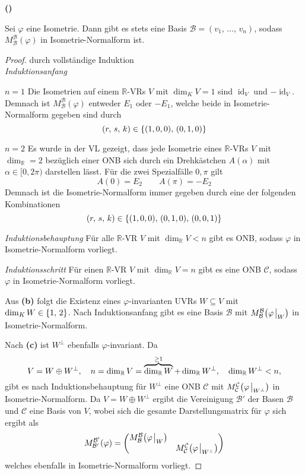 \documentclass[a4paper, 12pt]{scrartcl}
\newcounter{taski}
\newcounter{taskii}[taski]
\newcommand{\ttask}{\stepcounter{taskii}\textbf{(\alph{taskii})}~}
\DeclareMathOperator*{\id}{id}
\begin{document}
\ttask
\begin{theorem}
    Sei $\varphi$ eine Isometrie. Dann gibt es stets eine Basis $\mathcal{B} = (v_1,\, \dots,\, v_n)$, sodass $M^{\mathcal{B}}_{\mathcal{B}}(\varphi)$ in Isometrie-Normalform ist.
\end{theorem}
\begin{proof} durch vollständige Induktion \\
\emph{Induktionsanfang}

$n = 1$ \quad Die Isometrien auf einem $\mathbb{R}$-VRs $V$ mit $\dim_K V = 1$ sind $\id_V$ und $-\id_V$. Demnach ist $M^{\mathcal{B}}_{\mathcal{B}}(\varphi)$ entweder $E_1$ oder $-E_1$, welche beide in Isometrie-Normalform gegeben sind durch
\[ (r,\, s,\, k) \in \qty{(1,0,0),\, (0,1,0)} \]

$n = 2$ \quad Es wurde in der VL gezeigt, dass jede Isometrie eines $\mathbb{R}$-VRs $V$ mit $\dim_ \mathbb{R} = 2$ bezüglich einer ONB sich durch ein Drehkästchen $A(\alpha)$ mit $\alpha \in [0,2\pi)$ darstellen lässt. Für die zwei Spezialfälle $0, \pi$ gilt
\[ A(0) = E_2 \qquad A(\pi) = -E_2 \]
Demnach ist die Isometrie-Normalform immer gegeben durch eine der folgenden Kombinationen
\[ (r,\, s,\, k) \in \qty{(1, 0, 0),\, (0,1,0),\, (0, 0, 1)} \]

\emph{Induktionsbehauptung} Für alle $\mathbb{R}$-VR $V$ mit $\dim_ \mathbb{R} V < n$ gibt es ONB, sodass $\varphi$ in Isometrie-Normalform vorliegt.

\emph{Induktionsschritt} Für einen $\mathbb{R}$-VR $V$ mit $\dim_ \mathbb{R} V = n$ gibt es eine ONB $\mathcal{C}$, sodass $\varphi$ in Isometrie-Normalform vorliegt.

Aus \textbf{(b)} folgt die Existenz eines $\varphi$-invarianten UVRs $W \subseteq V$ mit $\dim_K W \in \qty{1,\, 2}$. Nach Induktionsanfang gibt es eine Basis $\mathcal{B}$ mit $M^{\mathcal{B}}_{\mathcal{B}}\qty(\varphi\eval_W)$ in Isometrie-Normalform.

Nach \textbf{(c)} ist $W^\perp$ ebenfalls $\varphi$-invariant. Da
\[ V = W \oplus W^\perp \qc n = \dim_ \mathbb{R} V = \overbrace{\dim_ \mathbb{R} W}^{\geq 1} + \dim_ \mathbb{R} W^\perp \qc \dim_ \mathbb{R} W^\perp < n, \]
gibt es nach Induktionsbehauptung für $W^\perp$ eine ONB $\mathcal{C}$ mit $M^{\mathcal{C}}_{\mathcal{C}}\qty(\varphi\eval_{W^\perp})$ in Isometrie-Normalform. Da $V = W \oplus W^\perp$ ergibt die Vereinigung $\mathcal{B}'$ der Basen $\mathcal{B}$ und $\mathcal{C}$ eine Basis von $V$, wobei sich die gesamte Darstellungsmatrix für $\varphi$ sich ergibt als
\[ M_{\mathcal{B}'}^{\mathcal{B}'}(\varphi) = \mqty(\diagonalmatrix{M^{\mathcal{B}}_{\mathcal{B}}\qty(\varphi\eval_{W}), M^{\mathcal{C}}_{\mathcal{C}}\qty(\varphi\eval_{W^\perp})}) \]
welches ebenfalls in Isometrie-Normalform vorliegt.
\end{proof}
\end{document}
